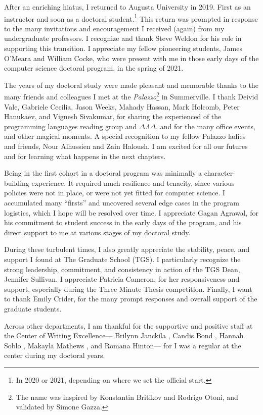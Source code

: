 After an enriching hiatus, I returned to Augusta University in 2019.
First as an instructor and soon as a doctoral student.\footnote{In 2020 or 2021, depending on where we set the official start.}
This return was prompted in response to the many invitations and encouragement I received (again) from my undergraduate professors.
I recognize and thank Steve Weldon for his role in supporting this transition.
I appreciate my fellow pioneering students, James O'Meara and William Cocke, who were present with me in those early days of the computer science doctoral program, in the spring of 2021.

The years of my doctoral study were made pleasant and memorable thanks to the many friends and colleagues I met at the \emph{Palazzo}\footnote{The name was inspired by Konstantin Britikov and Rodrigo Otoni, and validated by Simone Gazza.} in Summerville.
I thank Deivid Vale, Gabriele Cecilia, Jason Weeks, Mahady Hassan, Mark Holcomb, Peter Hanukaev, and Vignesh Sivakumar, for sharing the experienced of the programming languages reading group and $\Delta\Lambda\Delta$, and for the many office events, and other magical moments.
A special recognition to my fellow Palazzo ladies and friends, Nour Alhussien and Zain Haloush.
I am excited for all our futures and for learning what happens in the next chapters.

Being in the first cohort in a doctoral program was minimally a character-building experience.
It required much resilience and tenacity, since various policies were not in place, or were not yet fitted for computer science.
I accumulated many \enquote{firsts} and uncovered several edge cases in the program logistics, which I hope will be resolved over time.
I appreciate Gagan Agrawal, for his commitment to student success in the early days of the program, and his direct support to me at various stages of my doctoral study.

During these turbulent times, I also greatly appreciate the stability, peace, and support I found at The Graduate School (TGS).
I particularly recognize the strong leadership, commitment, and consistency in action of the TGS Dean, Jennifer Sullivan.
I appreciate Patricia Cameron, for her responsiveness and support, especially during the Three Minute Thesis competition.
Finally, I want to thank Emily Crider, for the many prompt responses and overall support of the graduate students.

Across other departments, I am thankful for the supportive and positive staff at the Center of Writing Excellence---%
Brilynn Janckila%
, Candis Bond%
, Hannah Soblo%
, Makayla Mathews%
, and Romana Hinton---%
for I was a regular at the center during my doctoral years.

